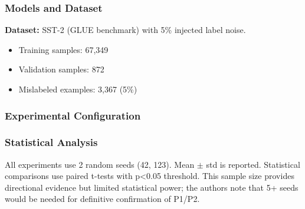 
\subsubsection{Models and Dataset}

\begin{table}[htbp]
\centering
{}
\end{table}

\textbf{Dataset:} SST-2 (GLUE benchmark) with 5\% injected label noise.
\begin{itemize}
\item Training samples: 67,349
\item Validation samples: 872
\item Mislabeled examples: 3,367 (5\%)
\end{itemize}

\subsubsection{Experimental Configuration}

\begin{table}[htbp]
\centering
{}
\end{table}

\subsubsection{Statistical Analysis}

All experiments use 2 random seeds (42, 123). Mean $\pm$ std is reported. Statistical comparisons use paired t-tests with p<0.05 threshold. This sample size provides directional evidence but limited statistical power; the authors note that 5+ seeds would be needed for definitive confirmation of P1/P2.

